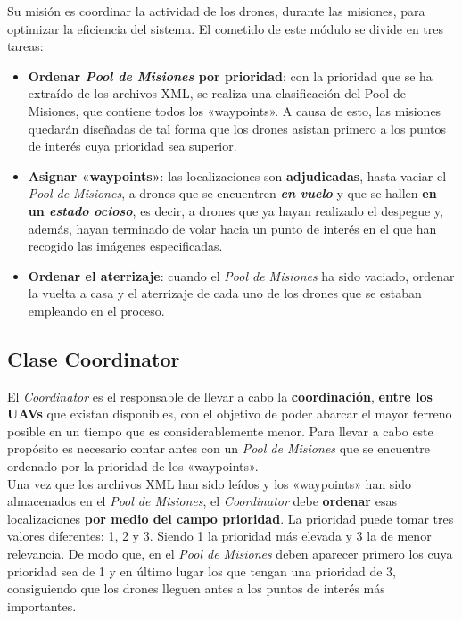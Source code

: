 Su misión es coordinar la actividad de los drones, durante las misiones, para optimizar la eficiencia del sistema. El cometido de este módulo se divide en tres tareas:

\begin{itemize}
\item \textbf{Ordenar \textit{Pool de Misiones} por prioridad}: con la prioridad que se ha extraído de los archivos XML, se realiza una clasificación del Pool de Misiones, que contiene todos los «waypoints». A causa de esto, las misiones quedarán diseñadas de tal forma que los drones asistan primero a los puntos de interés cuya prioridad sea superior.
\item \textbf{Asignar «waypoints»}: las localizaciones son \textbf{adjudicadas}, hasta vaciar el \textit{Pool de Misiones}, a drones que se encuentren \textbf{\textit{en vuelo}} y que se hallen \textbf{en un \textit{estado ocioso}}, es decir, a drones que ya hayan realizado el despegue y, además, hayan terminado de volar hacia un punto de interés en el que han recogido las imágenes especificadas. 
\item \textbf{Ordenar el aterrizaje}: cuando el \textit{Pool de Misiones} ha sido vaciado, ordenar la vuelta a casa y el aterrizaje de cada uno de los drones que se estaban empleando en el proceso.
\end{itemize}

\subsection{Clase Coordinator}

El \textit{Coordinator} es el responsable de llevar a cabo la \textbf{coordinación}, \textbf{entre los \acs{UAV}s} que existan disponibles, con el objetivo de poder abarcar el mayor terreno posible en un tiempo que es considerablemente menor. Para llevar a cabo este propósito es necesario contar antes con un \textit{Pool de Misiones} que se encuentre ordenado por la prioridad de los «waypoints». \\

Una vez que los archivos XML han sido leídos y los «waypoints» han sido almacenados en el \textit{Pool de Misiones}, el \textit{Coordinator} debe \textbf{ordenar} esas localizaciones \textbf{por medio del campo prioridad}. La prioridad puede tomar tres valores diferentes: 1, 2 y 3. Siendo 1 la prioridad más elevada y 3 la de menor relevancia. De modo que, en el \textit{Pool de Misiones} deben aparecer primero los  cuya prioridad sea de 1 y en último lugar los que tengan una prioridad de 3, consiguiendo que los drones lleguen antes a los puntos de interés más importantes.

